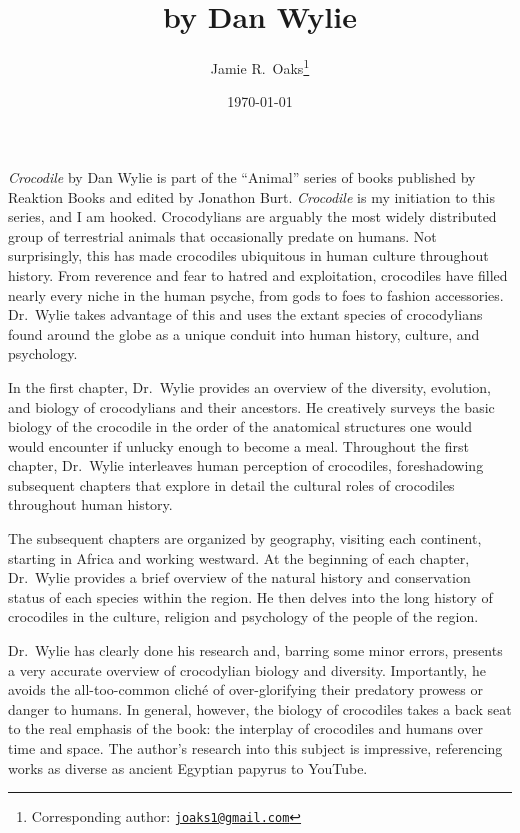 \documentclass[letterpaper,12pt]{article}
\title{\croc by Dan Wylie}
\author[1]{Jamie R.\ Oaks\thanks{Corresponding author: \href{mailto:joaks1@gmail.com}{\tt joaks1@gmail.com}}}
\affil[1]{Department of Biology, University of Washington, Seattle, Washington 98195}
\date{\today}
\newcommand{\croc}{\emph{Crocodile}\xspace}
\begin{document}
\maketitle

\newpage
\doublespacing

\croc by Dan Wylie \citep{Wylie2013} is part of the ``Animal'' series of books
published by Reaktion Books and edited by Jonathon Burt.
\croc is my initiation to this series, and I am hooked.
Crocodylians are arguably the most widely distributed group of terrestrial
animals that occasionally predate on humans.
Not surprisingly, this has made crocodiles ubiquitous in human culture
throughout history.
From reverence and fear to hatred and exploitation, crocodiles have filled
nearly every niche in the human psyche, from gods to foes to fashion
accessories.
Dr.\ Wylie takes advantage of this and uses the extant species of crocodylians
found around the globe as a unique conduit into human history, culture, and
psychology.

In the first chapter, Dr.\ Wylie provides an overview of the diversity,
evolution, and biology of crocodylians and their ancestors.
He creatively surveys the basic biology of the crocodile in the order of the
anatomical structures one would would encounter if unlucky enough to become a
meal.
Throughout the first chapter, Dr.\ Wylie interleaves human perception of
crocodiles, foreshadowing subsequent chapters that explore in detail the
cultural roles of crocodiles throughout human history.

The subsequent chapters are organized by geography, visiting each continent,
starting in Africa and working westward.
At the beginning of each chapter, Dr.\ Wylie provides a brief overview of the
natural history and conservation status of each species within the region.
He then delves into the long history of crocodiles in the culture, religion and
psychology of the people of the region.

Dr.\ Wylie has clearly done his research and, barring some minor errors,
presents a very accurate overview of crocodylian biology and diversity.
Importantly, he avoids the all-too-common clich\'e of over-glorifying their
predatory prowess or danger to humans.
In general, however, the biology of crocodiles takes a back seat to the real
emphasis of the book: the interplay of crocodiles and humans over time and
space.
The author's research into this subject is impressive, referencing works as
diverse as ancient Egyptian papyrus to YouTube.
\end{document}
